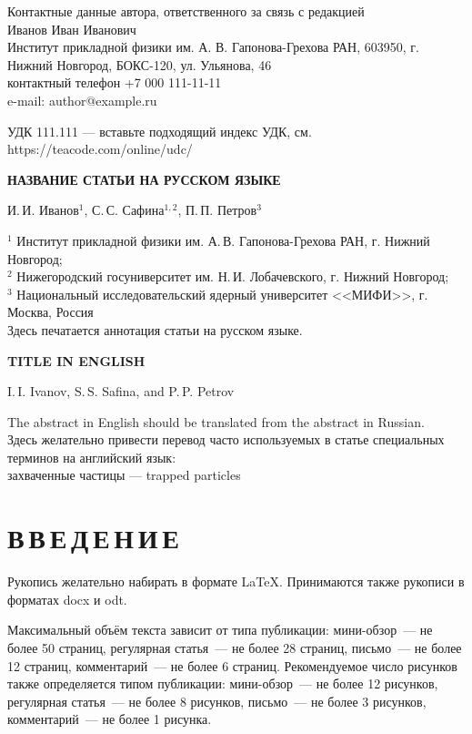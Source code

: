 \documentclass[12pt, a4paper]{article}
\begin{document}
\thispagestyle{empty}

Контактные данные автора, ответственного за связь с редакцией\\
Иванов Иван Иванович\\
Институт прикладной физики им. А. В. Гапонова-Грехова РАН, 603950, г. Нижний Новгород, БОКС-120, ул. Ульянова, 46\\
контактный телефон +7 000 111-11-11\\
e-mail: author@example.ru

\newpage
\setcounter{page}{1}

УДК 111.111 --- вставьте подходящий индекс УДК, см. https://teacode.com/online/udc/

{\large\bf НАЗВАНИЕ СТАТЬИ НА РУССКОМ ЯЗЫКЕ}

И.\,И. Иванов$^1$, С.\,С. Сафина$^{1,2}$, П.\,П. Петров$^3$

$^1$ Институт прикладной физики им. А.\,В. Гапонова-Грехова РАН, г. Нижний Новгород;\\
$^2$ Нижегородский госуниверситет им. Н.\,И. Лобачевского, г. Нижний Новгород;\\
$^3$ Национальный исследовательский ядерный университет <<МИФИ>>, г. Москва, Россия\\

Здесь печатается аннотация статьи на русском языке.

\newpage

{\large\bf TITLE IN ENGLISH}

I.\,I. Ivanov, S.\,S. Safina, and P.\,P. Petrov

The abstract in English should be translated from the abstract in Russian.\\

Здесь желательно привести перевод часто используемых в статье специальных терминов на английский язык:\\
захваченные частицы --- trapped particles

\newpage

\section*{В\,В\,Е\,Д\,Е\,Н\,И\,Е}

Рукопись желательно набирать в формате \LaTeX. Принимаются также рукописи в форматах docx и odt.

Максимальный объём текста зависит от типа публикации: мини-обзор~--- не более 50 страниц, регулярная статья~--- не более 28 страниц, письмо~--- не более 12 страниц, комментарий~--- не более 6 страниц. Рекомендуемое число рисунков также определяется типом публикации: мини-обзор~--- не более 12 рисунков, регулярная статья~--- не более 8 рисунков, письмо~--- не более 3 рисунков, комментарий~--- не более 1 рисунка.
\end{document}
